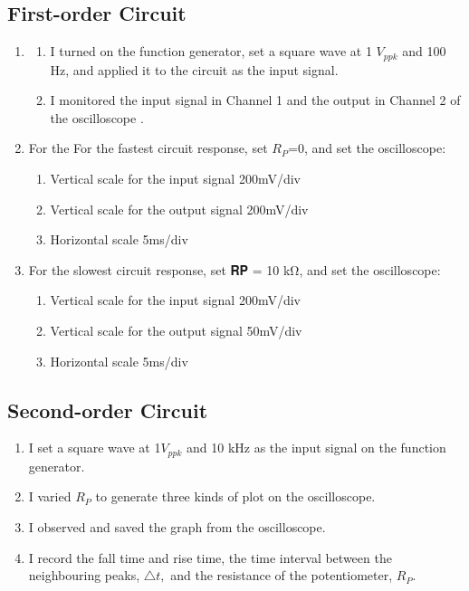 \documentclass[12pt]{article}
\begin{document}
\subsection{First-order Circuit}
\begin{enumerate}
\item \begin{enumerate}
\item I turned on the function generator, set a square wave at 1 $V_{ppk}$ and 100 Hz, and applied it to the circuit as the input signal.
\item I monitored the input signal in Channel 1 and the output in Channel 2 of the oscilloscope .
\end{enumerate}
\item For the For the fastest circuit response, set $R_P$=0, and set the oscilloscope:
\begin{enumerate}
\item Vertical scale for the input signal 200mV/div
\item Vertical scale for the output signal 200mV/div
\item Horizontal scale 5ms/div
\end{enumerate}
\item For the slowest circuit response, set 𝐑𝐏 = 10 kΩ, and set the oscilloscope:
\begin{enumerate}
\item Vertical scale for the input signal 200mV/div
\item Vertical scale for the output signal 50mV/div
\item Horizontal scale 5ms/div
\end{enumerate}
\end{enumerate}
\subsection{Second-order Circuit}
\begin{enumerate}
\item I set a square wave at 1$V_{ppk}$ and 10 kHz as the input signal on the function generator.
\item I varied $R_P$ to generate three kinds of plot on the oscilloscope.
\item I observed and saved the graph from the oscilloscope.
\item I record the fall time and rise time, the time interval between the neighbouring peaks, $\bigtriangleup t,$ and the resistance of the potentiometer, $R_P$.
\end{enumerate}
\end{document}
